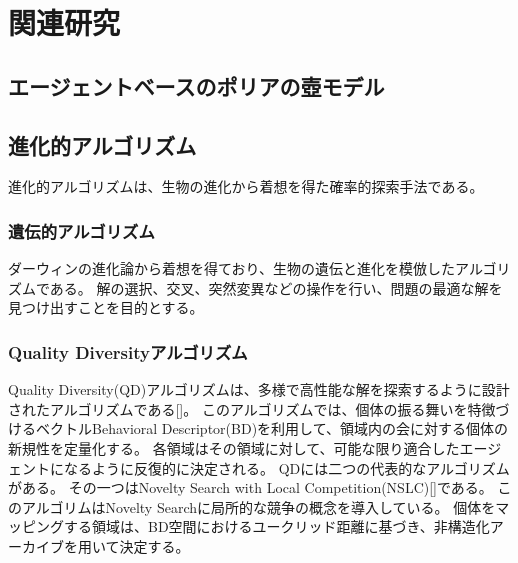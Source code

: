 \documentclass[uplatex,11pt,openany]{ujreport}
\begin{document}


\chapter{関連研究}
    \section{エージェントベースのポリアの壺モデル}


    \section{進化的アルゴリズム}
    進化的アルゴリズムは、生物の進化から着想を得た確率的探索手法である。

        \subsection{遺伝的アルゴリズム}
        ダーウィンの進化論から着想を得ており、生物の遺伝と進化を模倣したアルゴリズムである。
        解の選択、交叉、突然変異などの操作を行い、問題の最適な解を見つけ出すことを目的とする。

        \subsection{Quality Diversityアルゴリズム}
        Quality Diversity(QD)アルゴリズムは、多様で高性能な解を探索するように設計されたアルゴリズムである[]。
        このアルゴリズムでは、個体の振る舞いを特徴づけるベクトルBehavioral Descriptor(BD)を利用して、領域内の会に対する個体の新規性を定量化する。
        各領域はその領域に対して、可能な限り適合したエージェントになるように反復的に決定される。
        QDには二つの代表的なアルゴリズムがある。
        その一つはNovelty Search with Local Competition(NSLC)[]である。
        このアルゴリムはNovelty Searchに局所的な競争の概念を導入している。
        個体をマッピングする領域は、BD空間におけるユークリッド距離に基づき、非構造化アーカイブを用いて決定する。
\end{document}
